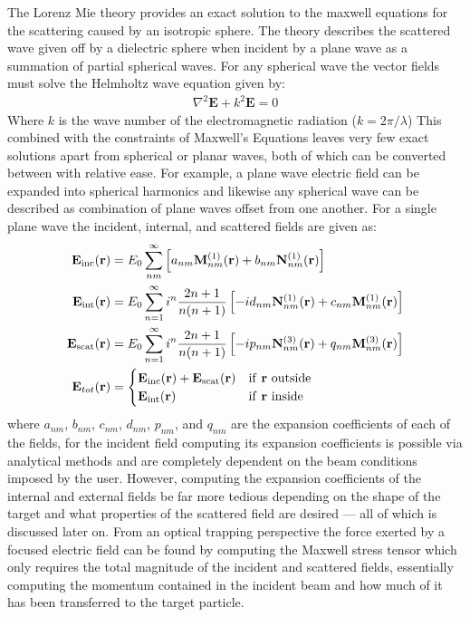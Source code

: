 The Lorenz Mie theory provides an exact solution to the maxwell equations for the scattering caused by an isotropic sphere. The theory describes the scattered wave given off by a dielectric sphere when incident by a plane wave as a summation of partial spherical waves. For any spherical wave the vector fields must solve the Helmholtz wave equation given by:
\begin{align}
	\nabla^2\mathbf{E} +k^2\mathbf{E} = 0
\end{align} 
Where $k$ is the wave number of the electromagnetic radiation ($k = 2\pi/\lambda$) This combined with the constraints of Maxwell's Equations leaves very few exact solutions apart from spherical or planar waves, both of which can be converted between with relative ease. For example, a plane wave electric field can be expanded into spherical harmonics and likewise any spherical wave can be described as combination of plane waves offset from one another. For a single plane wave the incident, internal, and scattered fields are given as:
\begin{align}
  {\bf E}_{\rm inc}({\bf r})
  &=
    E_0 \sum_{nm}^\infty \left[
    a_{nm}{\bf M}_{nm}^{(1)}({\bf r})
    + b_{nm}{\bf N}_{nm}^{(1)}({\bf r})\right]
  \\
  {\bf E}_{\rm int}({\bf r})
  &=
    E_0 \sum_{n=1}^\infty i^n\frac{2n+1}{n(n+1)}\left[
    -id_{nm}{\bf N}_{nm}^{(1)}({\bf r}) + c_{nm}{\bf M}_{nm}^{(1)}({\bf r})
    \right]
  \\
  {\bf E}_{\rm scat}({\bf r})
  &=
    E_0 \sum_{n=1}^\infty  i^n\frac{2n+1}{n(n+1)}\left[
      -i p_{nm}{\bf N}_{nm}^{(3)}({\bf r})+q_{nm}{\bf M}_{nm}^{(3)}({\bf r})
    \right] 
    \\
	\mathbf{E}_{tot}({\bf r}) &= 
	\begin{cases}
		{\bf E}_{\rm inc}({\bf r}) + {\bf E}_{\rm scat}({\bf r}) & \text{if \textbf{r} outside}
		\\ 
		{\bf E}_{\rm int}({\bf r}) & \text{if \textbf{r} inside}
	\end{cases}
\end{align}
where $a_{nm}$, $b_{nm}$, $c_{nm}$, $d_{nm}$, $p_{nm}$, and $q_{nm}$
are the expansion coefficients of each of the fields, for the incident
field computing its expansion coefficients is possible via analytical
methods and are completely dependent on the beam conditions imposed by
the user.  However, computing the expansion coefficients of the
internal and external fields be far more tedious depending on the
shape of the target and what properties of the scattered field are
desired --- all of which is discussed later on.  From an optical
trapping perspective the force exerted by a focused electric field can
be found by computing the Maxwell stress tensor which only requires
the total magnitude of the incident and scattered fields, essentially
computing the momentum contained in the incident beam and how much of
it has been transferred to the target particle.


